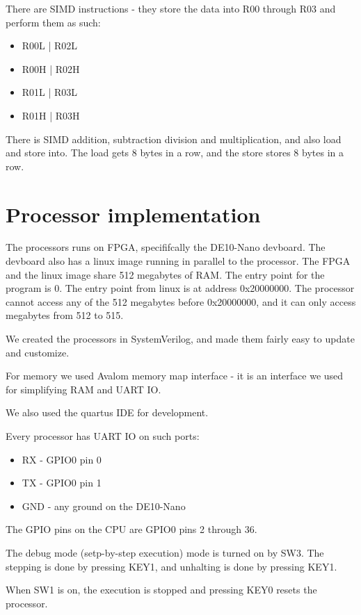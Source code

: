 \documentclass[conference]{IEEEtran}
\begin{document}
There are SIMD instructions - they store the data into R00 through R03 and perform them as such:
\begin{itemize}
	\item R00L | R02L
	\item R00H | R02H
	\item R01L | R03L
	\item R01H | R03H
\end{itemize}

There is SIMD addition, subtraction division and multiplication, and also load and store into.
The load gets 8 bytes in a row, and the store stores 8 bytes in a row.

\newpage
\section {Processor implementation}

The processors runs on FPGA, specififcally the DE10-Nano devboard. The devboard
also has a linux image running in parallel to the processor. The FPGA and the linux image
share 512 megabytes of RAM. The entry point for the program is 0.
The entry point from linux is at address 0x20000000. The processor cannot access any of the
512 megabytes before 0x20000000, and it can only access megabytes from 512 to 515.

We created the processors in SystemVerilog, and made them fairly easy to update and customize.

For memory we used Avalom memory map interface \cite{b8} - it is an interface we used for
simplifying RAM and UART IO.

We also used the quartus IDE for development.

Every processor has UART IO on such ports:
\begin{itemize}
	\item RX - GPIO0 pin 0
	\item TX - GPIO0 pin 1
	\item GND - any ground on the DE10-Nano
\end{itemize}

The GPIO pins on the CPU are GPIO0 pins 2 through 36.

The debug mode (setp-by-step execution) mode is turned on by SW3.
The stepping is done by pressing KEY1, and unhalting is done by pressing KEY1.

When SW1 is on, the execution is stopped and pressing KEY0 resets the processor.
\end{document}
